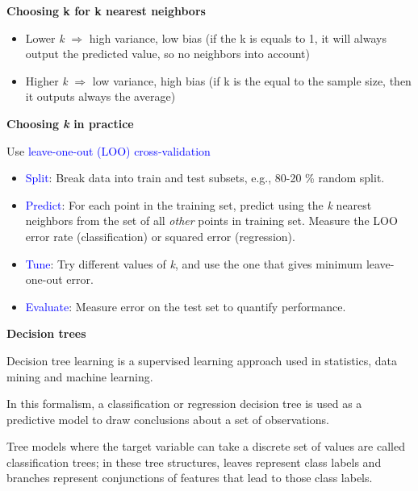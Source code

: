 \documentclass[11pt]{article}
\begin{document}
\textbf{Choosing k for k nearest neighbors}

\begin{itemize}
	\item Lower \textit{k} $\Rightarrow$ high variance, low bias (if the k is equals to 1, it will always output the predicted value, so no neighbors into account)
	\item Higher \textit{k} $\Rightarrow$ low variance, high bias (if k is the equal to the sample size, then it outputs always the average)
\end{itemize}

\textbf{Choosing \textit{k} in practice}

Use \textcolor{blue}{leave-one-out (LOO) cross-validation}

\begin{itemize}
	\item \textcolor{blue}{Split}: Break data into train and test subsets, e.g., 80-20 \% random split. 
	\item \textcolor{blue}{Predict}: For each point in the training set, predict using the \textit{k} nearest neighbors from the set of all \textit{other} points in training set. Measure the LOO error rate (classification) or squared error (regression). 
	\item \textcolor{blue}{Tune}: Try different values of \textit{k}, and use the one that gives minimum leave-one-out error.
	\item \textcolor{blue}{Evaluate}: Measure error on the test set to quantify performance. 
\end{itemize}

\vspace{0.5cm}

\begin{center}
  {\LARGE \textbf{Decision trees}}
\end{center}
\vspace{0.5cm}

Decision tree learning is a supervised learning approach used in statistics, data mining and machine learning.

In this formalism, a classification or regression decision tree is used as a predictive model to draw conclusions about a set of observations.

Tree models where the target variable can take a discrete set of values are called classification trees; in these tree structures, leaves represent class labels and branches represent conjunctions of features that lead to those class labels.
\end{document}
